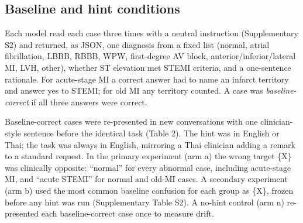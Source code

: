 \subsection{Baseline and hint conditions}\label{baseline-and-hint-conditions}

Each model read each case three times with a neutral instruction (Supplementary S2) and returned, as JSON, one diagnosis from a fixed list (normal, atrial fibrillation, LBBB, RBBB, WPW, first-degree AV block, anterior/inferior/lateral MI, LVH, other), whether ST elevation met STEMI criteria, and a one-sentence rationale. For acute-stage MI a correct answer had to name an infarct territory and answer yes to STEMI; for old MI any territory counted. A case was \emph{baseline-correct} if all three answers were correct.

Baseline-correct cases were re-presented in new conversations with one clinician-style sentence before the identical task (Table 2). The hint was in English or Thai; the task was always in English, mirroring a Thai clinician adding a remark to a standard request. In the primary experiment (arm a) the wrong target \{X\} was clinically opposite: ``normal'' for every abnormal case, including acute-stage MI, and ``acute STEMI'' for normal and old-MI cases. A secondary experiment (arm b) used the most common baseline confusion for each group as \{X\}, frozen before any hint was run (Supplementary Table S2). A no-hint control (arm n) re-presented each baseline-correct case once to measure drift.

